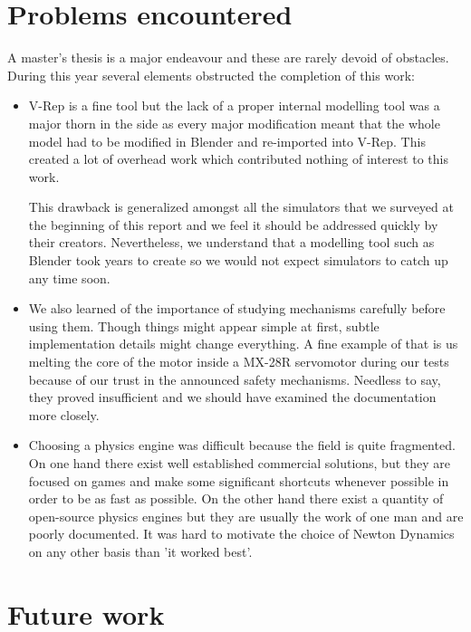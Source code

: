 \section{Problems encountered}
A master's thesis is a major endeavour and these are rarely devoid of obstacles. During this year several elements obstructed the completion of this work: \begin{itemize}
\item V-Rep is a fine tool but the lack of a proper internal modelling tool was a major thorn in the side as every major modification meant that the whole model had to be modified in Blender and re-imported into V-Rep. This created a lot of overhead work which contributed nothing of interest to this work. 

This drawback is generalized amongst all the simulators that we surveyed at the beginning of this report and we feel it should be addressed quickly by their creators. Nevertheless, we understand that a modelling tool such as Blender took years to create so we would not expect simulators to catch up any time soon.

\item We also learned of the importance of studying mechanisms carefully before using them. Though things might appear simple at first, subtle implementation details might change everything. A fine example of that is us melting the core of the motor inside a MX-28R servomotor during our tests because of our trust in the announced safety mechanisms. Needless to say, they proved insufficient and we should have examined the documentation more closely.

\item Choosing a physics engine was difficult because the field is quite fragmented. On one hand there exist well established commercial solutions, but they are focused on games and make some significant shortcuts whenever possible in order to be as fast as possible. On the other hand there exist a quantity of open-source physics engines but they are usually the work of one man and are poorly documented. It was hard to motivate the choice of Newton Dynamics on any other basis than 'it worked best'.
\end{itemize}

\section{Future work}

